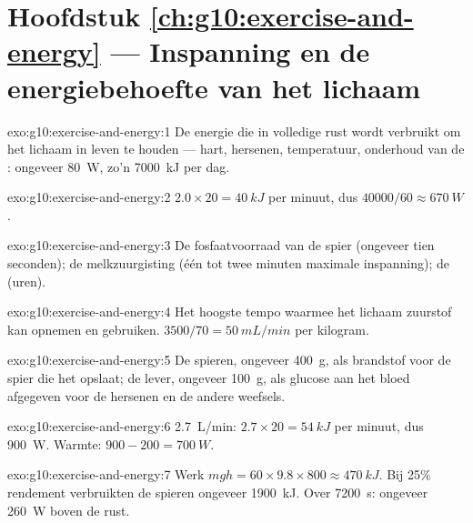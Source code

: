 \section*{Hoofdstuk \ref{ch:g10:exercise-and-energy} --- Inspanning en de energiebehoefte van het lichaam}

\begin{solution}{exo:g10:exercise-and-energy:1}
De energie die in volledige rust wordt verbruikt om het lichaam in leven
te houden --- hart, hersenen, temperatuur, onderhoud van de :
ongeveer \qty{80}{W}, zo'n \qty{7000}{kJ} per dag.
\end{solution}

\begin{solution}{exo:g10:exercise-and-energy:2}
$2.0 \times 20 = \qty{40}{kJ}$ per minuut, dus $40000/60 \approx
\qty{670}{W}$.
\end{solution}

\begin{solution}{exo:g10:exercise-and-energy:3}
De fosfaatvoorraad van de spier (ongeveer tien seconden); de
melkzuurgisting (één tot twee minuten maximale inspanning); de
 (uren).
\end{solution}

\begin{solution}{exo:g10:exercise-and-energy:4}
Het hoogste tempo waarmee het lichaam zuurstof kan opnemen en gebruiken.
$3500/70 = \qty{50}{mL/min}$ per kilogram.
\end{solution}

\begin{solution}{exo:g10:exercise-and-energy:5}
De spieren, ongeveer \qty{400}{g}, als brandstof voor de spier die het
opslaat; de lever, ongeveer \qty{100}{g}, als glucose aan het bloed
afgegeven voor de hersenen en de andere weefsels.
\end{solution}

\begin{solution}{exo:g10:exercise-and-energy:6}
\qty{2.7}{L/min}: $2.7 \times 20 = \qty{54}{kJ}$ per minuut, dus
\qty{900}{W}. Warmte: $900 - 200 = \qty{700}{W}$.
\end{solution}

\begin{solution}{exo:g10:exercise-and-energy:7}
Werk $mgh = 60 \times 9.8 \times 800 \approx \qty{470}{kJ}$. Bij 25\%
rendement verbruikten de spieren ongeveer \qty{1900}{kJ}. Over
\qty{7200}{s}: ongeveer \qty{260}{W} boven de rust.
\end{solution}

